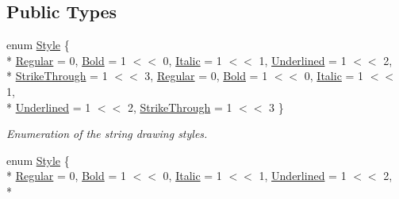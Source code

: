 \subsection*{Public Types}
\begin{DoxyCompactItemize}
\item 
enum \hyperlink{classsf_1_1_text_aa8add4aef484c6e6b20faff07452bd82}{Style} \{ \\*
\hyperlink{classsf_1_1_text_aa8add4aef484c6e6b20faff07452bd82a65dbbdd9d938efe1eea1e2f3b7d7c944}{Regular} = 0, 
\hyperlink{classsf_1_1_text_aa8add4aef484c6e6b20faff07452bd82a140bf2d7252e8ec458eca939783c0c5c}{Bold} = 1 $<$$<$ 0, 
\hyperlink{classsf_1_1_text_aa8add4aef484c6e6b20faff07452bd82af3e10eb0fa68aa746fbbdfcecbf352c9}{Italic} = 1 $<$$<$ 1, 
\hyperlink{classsf_1_1_text_aa8add4aef484c6e6b20faff07452bd82a1b5023b3374ff2d13d3e281fb286a952}{Underlined} = 1 $<$$<$ 2, 
\\*
\hyperlink{classsf_1_1_text_aa8add4aef484c6e6b20faff07452bd82a1f73626739a892db5b5fa0fc4f904132}{Strike\-Through} = 1 $<$$<$ 3, 
\hyperlink{classsf_1_1_text_aa8add4aef484c6e6b20faff07452bd82a65dbbdd9d938efe1eea1e2f3b7d7c944}{Regular} = 0, 
\hyperlink{classsf_1_1_text_aa8add4aef484c6e6b20faff07452bd82a140bf2d7252e8ec458eca939783c0c5c}{Bold} = 1 $<$$<$ 0, 
\hyperlink{classsf_1_1_text_aa8add4aef484c6e6b20faff07452bd82af3e10eb0fa68aa746fbbdfcecbf352c9}{Italic} = 1 $<$$<$ 1, 
\\*
\hyperlink{classsf_1_1_text_aa8add4aef484c6e6b20faff07452bd82a1b5023b3374ff2d13d3e281fb286a952}{Underlined} = 1 $<$$<$ 2, 
\hyperlink{classsf_1_1_text_aa8add4aef484c6e6b20faff07452bd82a1f73626739a892db5b5fa0fc4f904132}{Strike\-Through} = 1 $<$$<$ 3
 \}
\begin{DoxyCompactList}\small\item\em Enumeration of the string drawing styles. \end{DoxyCompactList}\item 
enum \hyperlink{classsf_1_1_text_aa8add4aef484c6e6b20faff07452bd82}{Style} \{ \\*
\hyperlink{classsf_1_1_text_aa8add4aef484c6e6b20faff07452bd82a65dbbdd9d938efe1eea1e2f3b7d7c944}{Regular} = 0, 
\hyperlink{classsf_1_1_text_aa8add4aef484c6e6b20faff07452bd82a140bf2d7252e8ec458eca939783c0c5c}{Bold} = 1 $<$$<$ 0, 
\hyperlink{classsf_1_1_text_aa8add4aef484c6e6b20faff07452bd82af3e10eb0fa68aa746fbbdfcecbf352c9}{Italic} = 1 $<$$<$ 1, 
\hyperlink{classsf_1_1_text_aa8add4aef484c6e6b20faff07452bd82a1b5023b3374ff2d13d3e281fb286a952}{Underlined} = 1 $<$$<$ 2, 
\\*
$$
\end{DoxyCompactItemize}
